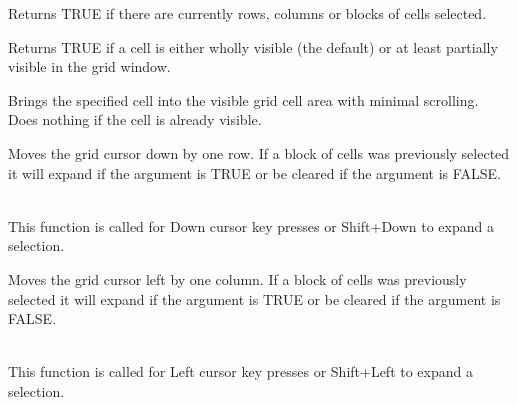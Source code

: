 
Returns TRUE if there are currently rows, columns or blocks of cells selected.

\label{wxgridisvisible}



Returns TRUE if a cell is either wholly visible (the default) or at least partially
visible in the grid window.

\label{wxgridmakecellvisible}



Brings the specified cell into the visible grid cell area with minimal scrolling. Does
nothing if the cell is already visible. 

\label{wxgridmovecursordown}


Moves the grid cursor down by one row. If a block of cells was previously selected it
will expand if the argument is TRUE or be cleared if the argument is FALSE.

\\
This function is called for Down cursor key presses or Shift+Down to expand a selection.

\label{wxgridmovecursorleft}


Moves the grid cursor left by one column. If a block of cells was previously selected it
will expand if the argument is TRUE or be cleared if the argument is FALSE.

\\
This function is called for Left cursor key presses or Shift+Left to expand a selection.

\label{wxgridmovecursorright}


